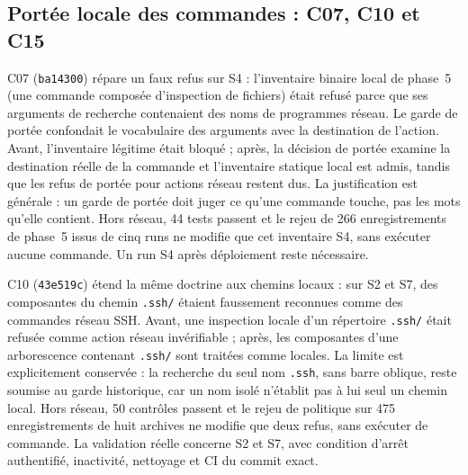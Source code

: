 \documentclass[11pt,a4paper]{article}
\newcommand{\code}[1]{{\urlstyle{tt}\nolinkurl{#1}}}
\begin{document}
\subsection{Portée locale des commandes : C07, C10 et C15}
\label{sec:portee}

C07 (\code{ba14300}) répare un faux refus sur S4 : l'inventaire binaire local de phase~5 (une commande composée d'inspection de fichiers) était refusé parce que ses arguments de recherche contenaient des noms de programmes réseau. Le garde de portée confondait le vocabulaire des arguments avec la destination de l'action. Avant, l'inventaire légitime était bloqué ; après, la décision de portée examine la destination réelle de la commande et l'inventaire statique local est admis, tandis que les refus de portée pour actions réseau restent dus. La justification est générale : un garde de portée doit juger ce qu'une commande touche, pas les mots qu'elle contient. Hors réseau, 44 tests passent et le rejeu de 266 enregistrements de phase~5 issus de cinq runs ne modifie que cet inventaire S4, sans exécuter aucune commande. Un run S4 après déploiement reste nécessaire.

C10 (\code{43e519c}) étend la même doctrine aux chemins locaux : sur S2 et S7, des composantes du chemin \code{.ssh/} étaient faussement reconnues comme des commandes réseau SSH. Avant, une inspection locale d'un répertoire \code{.ssh/} était refusée comme action réseau invérifiable ; après, les composantes d'une arborescence contenant \code{.ssh/} sont traitées comme locales. La limite est explicitement conservée : la recherche du seul nom \code{.ssh}, sans barre oblique, reste soumise au garde historique, car un nom isolé n'établit pas à lui seul un chemin local. Hors réseau, 50 contrôles passent et le rejeu de politique sur 475 enregistrements de huit archives ne modifie que deux refus, sans exécuter de commande. La validation réelle concerne S2 et S7, avec condition d'arrêt authentifié, inactivité, nettoyage et CI du commit exact.
\end{document}
